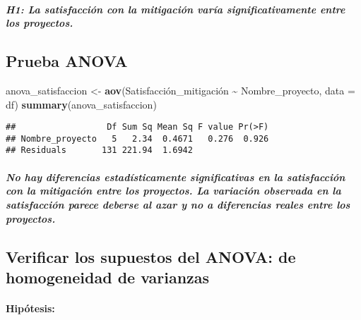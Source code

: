 \documentclass[
]{article}
\newenvironment{Shaded}{\begin{snugshade}}{\end{snugshade}}
\newcommand{\AttributeTok}[1]{\textcolor[rgb]{0.13,0.29,0.53}{#1}}
\newcommand{\FunctionTok}[1]{\textcolor[rgb]{0.13,0.29,0.53}{\textbf{#1}}}
\newcommand{\NormalTok}[1]{#1}
\newcommand{\OtherTok}[1]{\textcolor[rgb]{0.56,0.35,0.01}{#1}}
\newcommand{\SpecialCharTok}[1]{\textcolor[rgb]{0.81,0.36,0.00}{\textbf{#1}}}
\begin{document}
\subparagraph{H1: La satisfacción con la mitigación varía
significativamente entre los
proyectos.}\label{h1-la-satisfacciuxf3n-con-la-mitigaciuxf3n-varuxeda-significativamente-entre-los-proyectos.}

\subsection{\texorpdfstring{\textbf{Prueba
ANOVA}}{Prueba ANOVA}}\label{prueba-anova}

\begin{Shaded}
\begin{Highlighting}[]
\NormalTok{anova\_satisfaccion }\OtherTok{\textless{}{-}} \FunctionTok{aov}\NormalTok{(Satisfacción\_mitigación }\SpecialCharTok{\textasciitilde{}}\NormalTok{ Nombre\_proyecto, }\AttributeTok{data =}\NormalTok{ df)}
\FunctionTok{summary}\NormalTok{(anova\_satisfaccion)}
\end{Highlighting}
\end{Shaded}

\begin{verbatim}
##                  Df Sum Sq Mean Sq F value Pr(>F)
## Nombre_proyecto   5   2.34  0.4671   0.276  0.926
## Residuals       131 221.94  1.6942
\end{verbatim}

\subparagraph{\texorpdfstring{\emph{No hay diferencias estadísticamente
significativas en la satisfacción con la mitigación entre los proyectos.
La variación observada en la satisfacción parece deberse al azar y no a
diferencias reales entre los
proyectos.}}{No hay diferencias estadísticamente significativas en la satisfacción con la mitigación entre los proyectos. La variación observada en la satisfacción parece deberse al azar y no a diferencias reales entre los proyectos.}}\label{no-hay-diferencias-estaduxedsticamente-significativas-en-la-satisfacciuxf3n-con-la-mitigaciuxf3n-entre-los-proyectos.-la-variaciuxf3n-observada-en-la-satisfacciuxf3n-parece-deberse-al-azar-y-no-a-diferencias-reales-entre-los-proyectos.}

\subsection{\texorpdfstring{\textbf{Verificar los supuestos del ANOVA:}
de homogeneidad de
varianzas}{Verificar los supuestos del ANOVA: de homogeneidad de varianzas}}\label{verificar-los-supuestos-del-anova-de-homogeneidad-de-varianzas}

\paragraph{Hipótesis:}\label{hipuxf3tesis-5}
\end{document}
